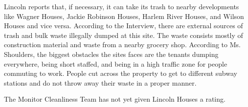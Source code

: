 Lincoln reports that, if necessary, it can take its trash to nearby developments like Wagner Houses, Jackie Robinson Houses, Harlem River Houses, and Wilson Houses and vice versa. According to the Interview, there are external sources of trash and bulk waste illegally dumped at this site. The waste consists mostly of construction material and waste from a nearby grocery shop. According to Ms. Shoulders, the biggest obstacles the sites faces are the tenants dumping everywhere, being short staffed, and being in a high traffic zone for people commuting to work. People cut across the property to get to different subway stations and do not throw away their waste in a proper manner. 

 

The Monitor Cleanliness Team has not yet given Lincoln Houses a rating.